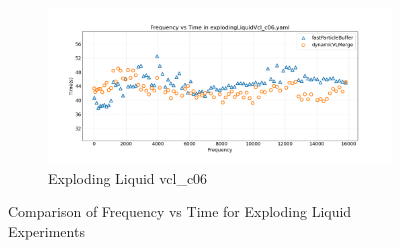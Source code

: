 \begin{figure}[htbp]
    \begin{subfigure}[b]{\textwidth}
        \centering
        \includegraphics[width=0.9\linewidth]{graphs/explodingLiquid/normalExperiments/freq/vclc06.png}
        \vspace{-0.5em}
        \caption{\scriptsize Exploding Liquid vcl\_c06}
        \label{fig:vclc06explodingLiquid}
    \end{subfigure}

    \vspace{1em}
    \caption{Comparison of Frequency vs Time for Exploding Liquid Experiments}
    \label{fig:mainExplodingLiquid}
\end{figure}


